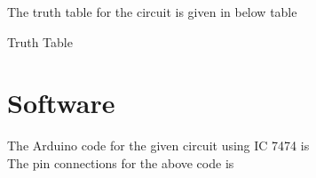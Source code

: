 \documentclass{article}
\begin{document}
	The truth table for the circuit is given in below table \\
	\begin{table}[h]
		\begin{center}
	
		\caption{Truth Table}
		\label{table:2}
		\end{center}
	\end{table}

\section{Software}
	The Arduino code for the given circuit using IC 7474 is \\
	
	The pin connections for the above code is
	
\end{document}
